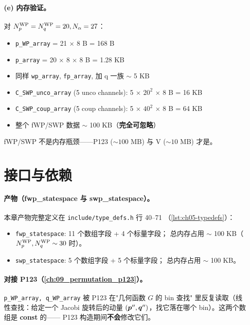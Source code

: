 \begin{numericalbox}[label={box:ch06-numerical-closure}]
\paragraph{(e) 内存验证。}
对 \({N_{p}^{\text{WP}}} = {N_{q}^{\text{WP}}} = 20, N_\alpha = 27\)：
\begin{itemize}
  \item \texttt{p\_WP\_array} = 21 \(\times\) 8 B = 168 B
  \item \texttt{p\_array} = 20 \(\times\) 8 \(\times\) 8 B = 1.28 KB
  \item 同样 \texttt{wp\_array}, \texttt{fp\_array}, 加 q 一族 \(\sim\) 5 KB
  \item \texttt{C\_SWP\_unco\_array} (5 unco channels): 5 \(\times\)
        \(20^2\) \(\times\) 8 B = 16 KB
  \item \texttt{C\_SWP\_coup\_array} (5 coup channels): 5 \(\times\)
        \(40^2\) \(\times\) 8 B = 64 KB
  \item 整个 fWP/SWP 数据 \(\sim\) 100 KB（\textbf{完全可忽略}）
\end{itemize}
fWP/SWP 不是内存瓶颈——P123 (\(\sim 100\) MB) 与 V (\(\sim 10\) MB) 才是。

\end{numericalbox}

\section{接口与依赖}
\label{sec:ch06-interface}

\paragraph{产物（fwp\_statespace 与 swp\_statespace）。}
本章产物完整定义在 \texttt{include/type\_defs.h} 行 40--71
（\cref{lst:ch05-typedefs}）：
\begin{itemize}
  \item \texttt{fwp\_statespace}: 11 个数组字段 + 4 个标量字段；
        总内存占用 \(\sim\) 100 KB（\({N_{p}^{\text{WP}}}, {N_{q}^{\text{WP}}} \sim 30\) 时）。
  \item \texttt{swp\_statespace}: 5 个数组字段 + 5 个标量字段；
        总内存占用 \(\sim\) 100 KB。
\end{itemize}

\paragraph{对接 P123（\cref{ch:09_permutation_p123}）。}
\texttt{p\_WP\_array, q\_WP\_array} 被 P123 在"几何函数 \(G\) 的 bin 查找"
里反复读取（线性查找：给定一个 Jacobi 旋转后的动量 \((\bm{p}'',
\bm{q}'')\)，找它落在哪个 bin）。这两个数组是 \textbf{const} 的——
P123 构造期间\textbf{不会}修改它们。

